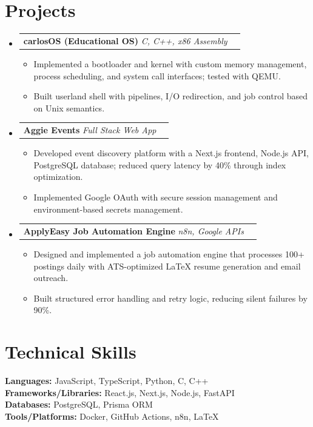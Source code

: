 \documentclass[letterpaper,11pt]{article}
\makeatletter
\newcommand{\resumeItem}[1]{
  \item\small{{#1 \vspace{-2pt}}}
}
\newcommand{\resumeProjectHeading}[2]{
    \item
    \begin{tabular*}{0.97\textwidth}{l@{\extracolsep{\fill}}r}
      \small#1 & #2 \\
    \end{tabular*}\vspace{-7pt}
}
\newcommand{\resumeSubHeadingListStart}{\begin{itemize}[leftmargin=0.15in, label={}]}
\newcommand{\resumeSubHeadingListEnd}{\end{itemize}}
\newcommand{\resumeItemListStart}{\begin{itemize}}
\newcommand{\resumeItemListEnd}{\end{itemize}\vspace{-5pt}}
\makeatother
\begin{document}
\section{Projects}
\resumeSubHeadingListStart
\resumeProjectHeading{\textbf{carlosOS (Educational OS)} \textit{C, C++, x86 Assembly}}{}
\resumeItemListStart
\resumeItem{Implemented a bootloader and kernel with custom memory management, process scheduling, and system call interfaces; tested with QEMU.}
\resumeItem{Built userland shell with pipelines, I/O redirection, and job control based on Unix semantics.}
\resumeItemListEnd

\resumeProjectHeading{\textbf{Aggie Events} \textit{Full Stack Web App}}{}
\resumeItemListStart
\resumeItem{Developed event discovery platform with a Next.js frontend, Node.js API, PostgreSQL database; reduced query latency by 40\% through index optimization.}
\resumeItem{Implemented Google OAuth with secure session management and environment-based secrets management.}
\resumeItemListEnd

\resumeProjectHeading{\textbf{ApplyEasy Job Automation Engine} \textit{n8n, Google APIs}}{}
\resumeItemListStart
\resumeItem{Designed and implemented a job automation engine that processes 100+ postings daily with ATS-optimized LaTeX resume generation and email outreach.}
\resumeItem{Built structured error handling and retry logic, reducing silent failures by 90\%.}
\resumeItemListEnd
\resumeSubHeadingListEnd

\section{Technical Skills}
\begin{itemize}[leftmargin=0.15in, label={}]
  \small{\item{
    \textbf{Languages:} JavaScript, TypeScript, Python, C, C++ \\
    \textbf{Frameworks/Libraries:} React.js, Next.js, Node.js, FastAPI \\
    \textbf{Databases:} PostgreSQL, Prisma ORM \\
    \textbf{Tools/Platforms:} Docker, GitHub Actions, n8n, LaTeX
  }}
\end{itemize}
\end{document}
